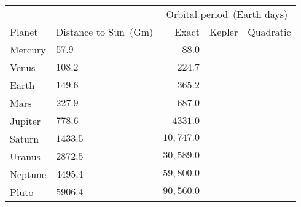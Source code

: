 \begin{tabular}{llrrr}                                                 \toprule
        &                      & \multicolumn{3}{c}{Orbital period~(Earth days)} \\
  \cmidrule{3-5}
Planet  & Distance to Sun~(Gm) & Exact & Kepler & Quadratic \\\midrule
Mercury & $57.9$               & $88.0$     \\[4pt]
Venus   & $108.2$              & $224.7$    \\[4pt]
Earth   & $149.6$              & $365.2$    \\[4pt]
Mars    & $227.9$              & $687.0$    \\[4pt]
Jupiter & $778.6$              & $4331.0$   \\[4pt]
Saturn  & $1433.5$             & $10,747.0$ \\[4pt]
Uranus  & $2872.5$             & $30,589.0$ \\[4pt]
Neptune & $4495.4$             & $59,800.0$ \\[4pt]
Pluto   & $5906.4$             & $90,560.0$ \\\bottomrule
\end{tabular}
